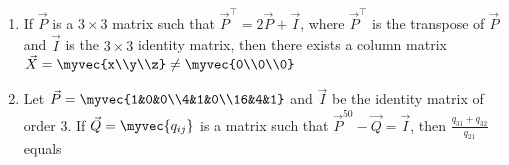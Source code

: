 \begin{enumerate}[label=\thesubsection.\arabic*.,ref=\thesubsection.\theenumi]
            \item If $\vec{P}$ is a $3 \times 3$ matrix such that $\vec{P}^{\top} = 2\vec{P} +\vec{I}$, where $\vec{P}^{\top}$ is the transpose of $\vec{P}$ and $\vec{I}$ is the $3 \times 3$ identity matrix, then there exists a column matrix $\vec{X}=\myvec{x\\y\\z} \neq \myvec{0\\0\\0}$
                \hfill{}
                \begin{enumerate}

                \end{enumerate}

            \item Let $\vec{P}=\myvec{1&0&0\\4&1&0\\16&4&1}$ and $\vec{I}$ be the identity matrix of order 3. If $\vec{Q} = \myvec{q_{ij}}$ is a matrix such that $\vec{P}^{50} -\vec{Q} =\vec{I}$, then $\frac{q_{31}+q_{32}}{q_{21}}$ equals
                \hfill{}
                \begin{enumerate}

                \end{enumerate}


\end{enumerate}
